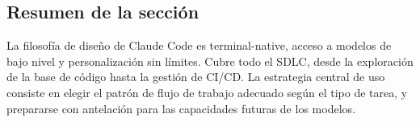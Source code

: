 \subsection{Resumen de la sección}

La filosofía de diseño de Claude Code es terminal-native, acceso a modelos de bajo nivel y personalización sin límites. Cubre todo el SDLC, desde la exploración de la base de código hasta la gestión de CI/CD. La estrategia central de uso consiste en elegir el patrón de flujo de trabajo adecuado según el tipo de tarea, y prepararse con antelación para las capacidades futuras de los modelos.

